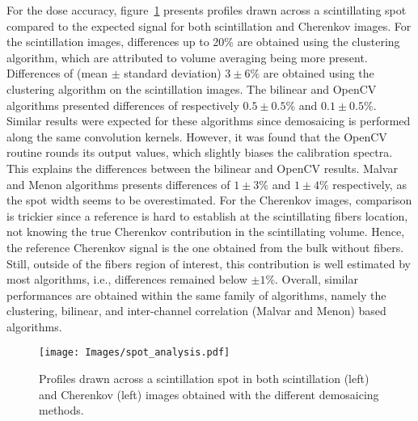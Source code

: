\documentclass[12pt]{iopart}
\begin{document}
For the dose accuracy, figure~\ref{fig:spot_analysis} presents profiles drawn across a scintillating spot compared to the expected signal for both scintillation and Cherenkov images. For the scintillation images, differences up to 20\% are obtained using the clustering algorithm, which are attributed to volume averaging being more present. Differences of (mean $\pm$ standard deviation) $3\pm6\%$ are obtained using the clustering algorithm on the scintillation images. The bilinear and OpenCV algorithms presented differences of  respectively $0.5\pm0.5\%$ and $0.1\pm0.5\%$. Similar results were expected for these algorithms since demosaicing is performed along the same convolution kernels. However, it was found that the OpenCV routine rounds its output values, which slightly biases the calibration spectra. This explains the differences between the bilinear and OpenCV results. Malvar and Menon algorithms presents differences of $1\pm3\%$ and $1\pm4\%$ respectively, as the spot width seems to be overestimated. For the Cherenkov images, comparison is trickier since a reference is hard to establish at the scintillating fibers location, not knowing the true Cherenkov contribution in the scintillating volume. Hence, the reference Cherenkov signal is the one obtained from the bulk without fibers. Still, outside of the fibers region of interest, this contribution is well estimated by most algorithms, i.e., differences remained below $\pm1\%$. Overall, similar performances are obtained within the same family of algorithms, namely the clustering, bilinear, and inter-channel correlation (Malvar and Menon) based algorithms.
\begin{figure}[ht]
    \centering
    \texttt{[image: Images/spot\_analysis.pdf]}
    \caption{Profiles drawn across a scintillation spot in both scintillation (left) and Cherenkov (left) images obtained with the different demosaicing methods.}
    \label{fig:spot_analysis}
\end{figure}
\end{document}
